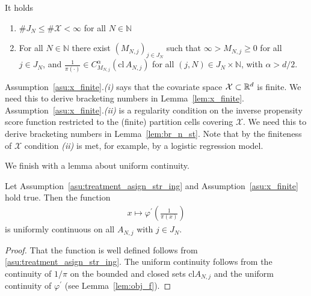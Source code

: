  \begin{assumption}
   \label{asu:x_finite}
   It holds
   \begin{enumerate}[label=(\roman*)]
     \item 
       $\# J_N\le \# \mathcal{X}<\infty$ for all $N\in\mathbb{N}$
\item
  For all $N\in\mathbb{N}$ there exist $(M_{N,j})_{j\in J_N}$ such that $\infty>M_{N,j}\ge 0$ for all $j\in J_N$, and 
  $\frac{1}{\pi(\cdot)}\in C^\alpha_{M_{N,j}}(\mathrm{cl}\,A_{N,j})$ for all $(j,N)\in J_N\times \mathbb{N}$, with $\alpha>d/2$.
   \end{enumerate}
 \end{assumption}
 \begin{remark}
   Assumption~\ref{asu:x_finite}.\textit{(i)} says that the covariate space $\mathcal{X}\subset \mathbb{R}^d$ is finite.
   We need this to derive bracketing numbers in Lemma~\ref{lem:x_finite}.
   Assumption~\ref{asu:x_finite}.\textit{(ii)} is a regularity condition on the inverse propensity score function restricted to the (finite) partition cells covering $\mathcal{X}$.
   We need this to derive bracketing numbers in Lemma~\ref{lem:br_n_st}.
   Note that by the finiteness of $\mathcal{X}$ condition \textit{(ii)} is met, for example, by a logistic regression model.  
 \end{remark}
 We finish with a lemma about uniform continuity.
 \begin{lemma}
   \label{lem:ips_unif_cont}
   Let Assumption~\eqref{asu:treatment_asign_str_ing} and Assumption~\ref{asu:x_finite} hold true.
   Then the function 
   \begin{align*}
     x\mapsto 
     \varphi^{'}
     \left( \frac{1}{\pi(x)} \right)
   \end{align*}
   is uniformly continuous on all $A_{N,j}$ with $j\in J_N$.
 \end{lemma}
 \begin{proof}
   That the function is well defined follows from \eqref{asu:treatment_asign_str_ing}.
   The uniform continuity follows from the continuity of $1/\pi$ on the bounded 
   and closed sets $\mathrm{cl} A_{N,j}$ and the uniform continuity of 
   $
   \varphi^{'}
   $ (see Lemma~\ref{lem:obj_f}).
 \end{proof}
